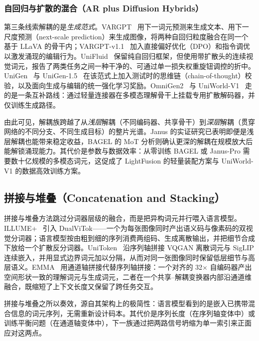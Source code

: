 \subsubsection{自回归与扩散的混合（AR plus Diffusion Hybrids）}
\label{subsubsec:ar-diff}

第三条线索解耦的是\emph{生成范式}。VARGPT~\cite{zhuang2025vargpt} 用下一词元预测来生成文本、用下一尺度预测（next-scale prediction）来生成图像，将两种自回归粒度融合在同一个基于 LLaVA 的骨干内；VARGPT-v1.1~\cite{zhuang2025vargptv11} 加入直接偏好优化（DPO）和指令调优以激发涌现的编辑行为。UniFluid~\cite{fan2025unifluid} 保留纯自回归框架，但使用带扩散头的连续视觉词元，报告了两类任务之间一种干净的、可通过单一损失权重旋钮调控的折中。UniGen~\cite{tian2025unigen} 与 UniGen-1.5~\cite{tian2025unigen15} 在该范式上加入测试时的思维链（chain-of-thought）校验，以及面向生成与编辑的统一强化学习奖励。OmniGen2~\cite{wu2025omnigen2} 与 UniWorld-V1~\cite{lin2025uniworld} 走的是一条互补路线：通过轻量连接器在多模态理解骨干上挂载专用扩散解码器，并仅训练生成路径。

由此可见，解耦族跨越了从\emph{浅层}解耦（不同编码器、共享骨干）到\emph{深层}解耦（贯穿网络的不同分支、不同生成目标）的整片光谱。Janus 的实证研究已表明即便是浅层解耦也能带来稳定收益，BAGEL 的 MoT 分析则确认更深的解耦在规模放大后能解锁涌现能力。其代价是参数与数据效率：从零训练 BAGEL 或 Janus-Pro 需要数十亿规模的多模态词元，这促成了 LightFusion 的轻量装配方案与 UniWorld-V1 的数据高效训练方案。

\subsection{拼接与堆叠（Concatenation and Stacking）}
\label{subsec:concat-stack}

拼接与堆叠方法跳过分词器层级的融合，而是把异构词元并行喂入语言模型。ILLUME+~\cite{huang2025illumeplus} 引入 DualViTok——一个为每张图像同时产出语义码与像素码的双视觉分词器；语言模型按由粗到细的序列消费两组码、生成离散输出，并把细节合成下放给一个扩散反分词器。UniToken~\cite{jiao2025unitoken} 沿序列轴拼接 VQGAN 离散词元与 SigLIP 连续嵌入，并用显式边界词元加以分隔，从而对同一张图像同时保留低层细节与高层语义。EMMA~\cite{he2025emma} 用通道轴拼接代替序列轴拼接：一个对齐的 32$\times$ 自编码器产出空间形状一致的理解词元与生成词元，二者在一个共享--解耦变换器内部沿通道维融合，既缩短了上下文长度又保留了跨任务交互。

拼接与堆叠之所以奏效，源自其架构上的极简性：语言模型看到的是嵌入已携带混合信息的词元序列，无需重新设计码本。其代价是序列长度（在序列轴变体中）或训练平衡问题（在通道轴变体中），下一族通过把两路信号坍缩为单一索引来正面应对这两点。

